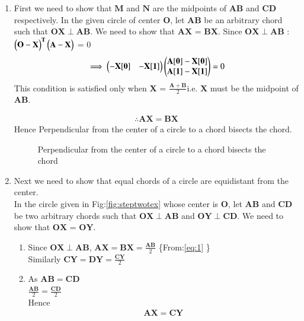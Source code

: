 \renewcommand{\vec}[1]{\mathbf{#1}}
\renewcommand{\theequation}{\theenumi}
\begin{enumerate}[label=\thesection.\arabic*.,ref=\thesection.\theenumi]


\item First we need to show that $\vec{M}$ and $\vec{N}$ are the midpoints of $\vec{AB}$ and $\vec{CD}$ respectively.
In the given circle of center $\vec{O}$, let $\vec{AB}$ be an arbitrary chord such that $\vec{OX} \perp \vec{AB}$. We need to show that $\vec{AX}$ = $\vec{BX}$.
Since $\vec{OX} \perp \vec{AB}$ :\\
$\myvec{\vec{O-X}}^\vec{T}\myvec{\vec{A-X}}$ = 0\\
\begin{align}
\implies \myvec{\vec{-X[0]} & \vec{-X[1]}}\myvec{\vec{A[0]-X[0]}\\\vec{A[1]-X[1]}} = 0
\end{align}
This condition is satisfied only when $ \vec{X}$ = $\frac{\vec{A+B}}{2}$\quad i.e.  $\vec{X}$ must be the midpoint of $\vec{AB}$.

\begin{align}
	\therefore \vec{AX} = \vec{BX} \label{eq:1}
\end{align}
Hence Perpendicular from the center of a circle to a chord bisects the chord.
  
\begin{figure}[!ht]
\centering
\resizebox{\columnwidth}{!}{}
\caption{Perpendicular from the center of a circle to a chord bisects the chord}
\label{fig:steponetex}	
\end{figure}




\item Next we need to show that equal chords of a circle are equidistant from the center.\\

In the circle given in Fig:\ref{fig:steptwotex} whose center is $\vec{O}$, let $\vec{AB}$ and $\vec{CD}$ be two arbitrary chords such that $\vec{OX} \perp \vec{AB}$ and $\vec{OY} \perp \vec{CD}$. We need to show that $\vec{OX}$ = $\vec{OY}$.
 

\begin{enumerate}
	
	\item Since $\vec{OX} \perp \vec{AB}$, $\vec{AX} =  \vec{BX} = \frac{\vec{AB}}{2}$ \{From:\eqref{eq:1} \}\\
	Similarly $\vec{CY} =  \vec{DY} = \frac{\vec{CY}}{2}$\\
	\item As $\vec{AB} =  \vec{CD}$\\
	$\frac{\vec{AB}}{2} = \frac{\vec{CD}}{2}$\\
	Hence 
	\begin{align}
	\vec{AX} =  \vec{CY} \label{eq:2}
	\end{align}
	

\end{enumerate}
\end{enumerate}
